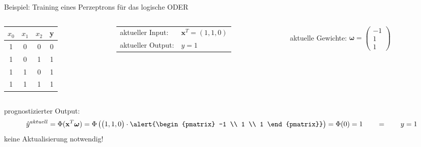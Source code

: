 \documentclass[11pt, aspectratio=169, t]{beamer}
\begin{document}
\begin{frame}{Beispiel: Training eines Perzeptrons für das logische ODER}
\begin{small}
\begin{columns}
\begin{column}{0.25\textwidth}
\hspace{0.5cm}
\begin{footnotesize}
\begin{tabular}{cccc} \toprule
$x_0$ & $x_1$ & $x_2$ & y \\ \midrule
1 & 0 & 0 & 0 \\
1 & 0 & 1 & 1 \\
1 & 1 & 0 & 1 \\
1 & 1 & 1 & 1 \\ \bottomrule
\end{tabular} \end{footnotesize}
\end{column}
\begin{column}{0.4\textwidth}
\begin{tabular}{ll}
aktueller Input: & $\mathbf{x}^{T} = (1, 1, 0)$ \\
aktueller Output: & $y=1$ \\
\end{tabular}
\end{column}
\begin{column}{0.4\textwidth}
aktuelle Gewichte: \alert{ $\boldsymbol{\omega} = \begin{pmatrix} -1 \\ 1 \\ 1 \end{pmatrix}$ }
\end{column}
\end{columns}
prognostizierter Output:
\[\hat{y}^{aktuell} = \Phi(\mathbf{x}^{T}\boldsymbol{\omega}) = \Phi\left( \begin{pmatrix} 1, 1, 0 \end{pmatrix}\cdot \alert{\begin{pmatrix} -1 \\ 1 \\ 1 \end{pmatrix}} \right) = \Phi(0) = 1 \qquad = \qquad y = 1\]
keine Aktualisierung notwendig!
\begin{align*} %
\phantom{\omega_0^{\text{neu}}} & \\
\phantom{\omega_1^{\text{neu}}} & \\
\phantom{\omega_2^{\text{neu}}} &
\end{align*}
\end{small}
\end{frame}
\end{document}
